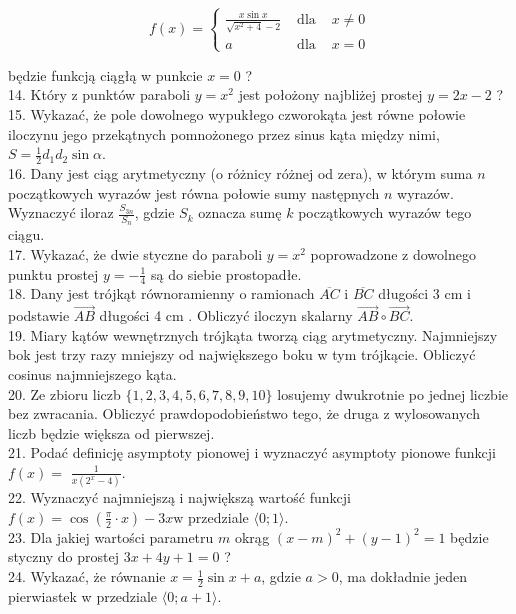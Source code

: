 \documentclass[10pt]{article}
\begin{document}
\[
f(x)=\left\{\begin{array}{ccc}
\frac{x \sin x}{\sqrt{x^{2}+4}-2} & \text { dla } & x \neq 0 \\
a & \text { dla } & x=0
\end{array}\right.
\]

będzie funkcją ciągłą w punkcie \(x=0\) ?\\
14. Który z punktów paraboli \(y=x^{2}\) jest położony najbliżej prostej \(y=2 x-2\) ?\\
15. Wykazać, że pole dowolnego wypukłego czworokąta jest równe połowie iloczynu jego przekątnych pomnożonego przez sinus kąta między nimi, \(S=\frac{1}{2} d_{1} d_{2} \sin \alpha\).\\
16. Dany jest ciąg arytmetyczny (o różnicy różnej od zera), w którym suma \(n\) początkowych wyrazów jest równa połowie sumy następnych \(n\) wyrazów. Wyznaczyć iloraz \(\frac{S_{3 n}}{S_{n}}\), gdzie \(S_{k}\) oznacza sumę \(k\) początkowych wyrazów tego ciągu.\\
17. Wykazać, że dwie styczne do paraboli \(y=x^{2}\) poprowadzone z dowolnego punktu prostej \(y=-\frac{1}{4}\) są do siebie prostopadłe.\\
18. Dany jest trójkąt równoramienny o ramionach \(\overline{A C}\) i \(\overline{B C}\) długości 3 cm i podstawie \(\overrightarrow{A B}\) długości 4 cm . Obliczyć iloczyn skalarny \(\overrightarrow{A B} \circ \overrightarrow{B C}\).\\
19. Miary kątów wewnętrznych trójkąta tworzą ciąg arytmetyczny. Najmniejszy bok jest trzy razy mniejszy od największego boku w tym trójkącie. Obliczyć cosinus najmniejszego kąta.\\
20. Ze zbioru liczb \(\{1,2,3,4,5,6,7,8,9,10\}\) losujemy dwukrotnie po jednej liczbie bez zwracania. Obliczyć prawdopodobieństwo tego, że druga z wylosowanych liczb będzie większa od pierwszej.\\
21. Podać definicję asymptoty pionowej i wyznaczyć asymptoty pionowe funkcji \(f(x)=\) \(\frac{1}{x\left(2^{x}-4\right)}\).\\
22. Wyznaczyć najmniejszą i największą wartość funkcji \(f(x)=\cos \left(\frac{\pi}{2} \cdot x\right)-3 x \mathrm{w}\) przedziale \(\langle 0 ; 1\rangle\).\\
23. Dla jakiej wartości parametru \(m\) okrąg \((x-m)^{2}+(y-1)^{2}=1\) będzie styczny do prostej \(3 x+4 y+1=0\) ?\\
24. Wykazać, że równanie \(x=\frac{1}{2} \sin x+a\), gdzie \(a>0\), ma dokładnie jeden pierwiastek w przedziale \(\langle 0 ; a+1\rangle\).\\
\end{document}
